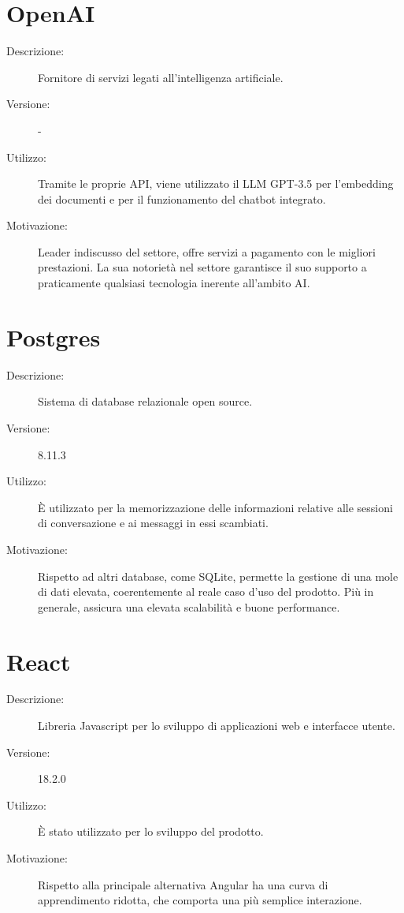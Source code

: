 \section{OpenAI}
\begin{description}
\item[Descrizione:] Fornitore di servizi legati all'intelligenza artificiale.
\item[Versione:] -
\item[Utilizzo:] Tramite le proprie API, viene utilizzato il LLM GPT-3.5 per l'embedding dei documenti e per il funzionamento del chatbot integrato.
\item[Motivazione:] Leader indiscusso del settore, offre servizi a pagamento con le migliori prestazioni. La sua notorietà nel settore garantisce il suo supporto a praticamente qualsiasi tecnologia inerente all'ambito AI.
\end{description}

\section{Postgres}
\begin{description}
\item[Descrizione:] Sistema di database relazionale open source.
\item[Versione:] 8.11.3
\item[Utilizzo:] È utilizzato per la memorizzazione delle informazioni relative alle sessioni di conversazione e ai messaggi in essi scambiati.
\item[Motivazione:] Rispetto ad altri database, come SQLite, permette la gestione di una mole di dati elevata, coerentemente al reale caso d'uso del prodotto. Più in generale, assicura una elevata scalabilità e buone performance.
\end{description}

\section{React}
\begin{description}
\item[Descrizione:] Libreria Javascript per lo sviluppo di applicazioni web e interfacce utente.
\item[Versione:] 18.2.0
\item[Utilizzo:] È stato utilizzato per lo sviluppo del prodotto.
\item[Motivazione:] Rispetto alla principale alternativa Angular ha una curva di apprendimento ridotta, che comporta una più semplice interazione.
\end{description}

